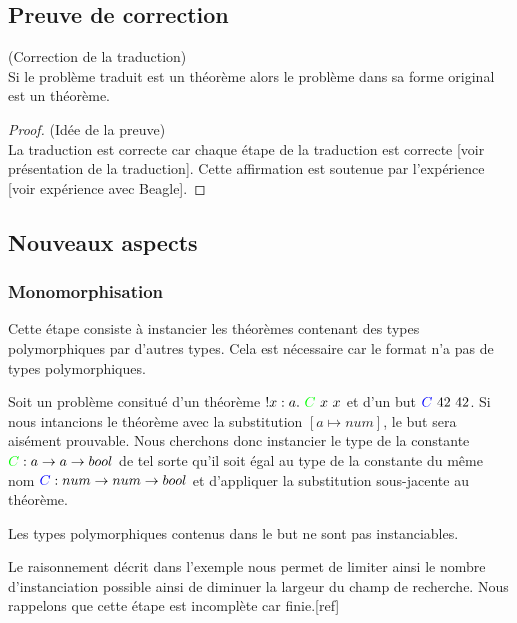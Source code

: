 \subsection{Preuve de correction}

\begin{thm}(Correction de la traduction)
\\Si le problème traduit est un théorème alors le problème dans sa forme original est un théorème.
\end{thm}

\begin{proof}(Idée de la preuve)
\\La traduction est correcte car chaque étape de la traduction est correcte [voir présentation de la traduction]. Cette affirmation est soutenue par l'expérience [voir expérience avec Beagle].
\end{proof}

\subsection{Nouveaux aspects}
\label{sec:traduction:nouveautes}

\subsubsection{Monomorphisation}
Cette étape consiste à instancier les théorèmes contenant des types polymorphiques par d'autres types. Cela est nécessaire car le format \tff n'a pas de types polymorphiques.
  
\begin{example}
Soit un problème consitué d'un théorème $!x:a.\ {\color{green}C}\ x\ x$ et d'un but ${\color{blue}C} \ 42\ 42$. Si nous intancions le théorème avec la substitution $[a \mapsto num]$, le but sera aisément prouvable.
Nous cherchons donc instancier le type de la constante ${\color{green}C} : a \rightarrow a \rightarrow bool$ de tel sorte qu'il soit égal au type de la constante du m\^eme nom ${\color{blue}C} : num \rightarrow num \rightarrow bool$ et d'appliquer la substitution sous-jacente au théorème.
\end{example}
 
\begin{remark}
Les types polymorphiques contenus dans le but ne sont pas instanciables.
\end{remark} 
  
Le raisonnement décrit dans l'exemple nous permet de limiter ainsi le nombre d'instanciation possible ainsi de diminuer la largeur du champ de recherche. Nous rappelons que cette étape est incomplète car finie.[ref]


